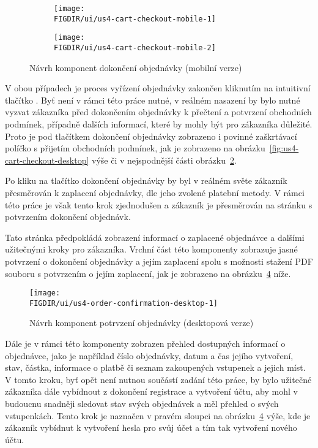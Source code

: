 \begin{figure}[H]
    \centering
    \begin{subfigure}{0.4\textwidth}
        \texttt{[image: \\FIGDIR/ui/us4-cart-checkout-mobile-1]}
        \label{fig:us4-cart-checkout-mobile-1}
    \end{subfigure}
    \hfill
    \begin{subfigure}{0.4\textwidth}
        \texttt{[image: \\FIGDIR/ui/us4-cart-checkout-mobile-2]}
        \label{fig:us4-cart-checkout-mobile-2}
    \end{subfigure}

    \caption{Návrh komponent dokončení objednávky (mobilní verze)}
    \label{fig:us4-cart-checkout-mobile}
\end{figure}

V obou případech je proces vyřízení objednávky zakončen kliknutím na intuitivní tlačítko .
Byť není v rámci této práce nutné, v reálném nasazení by bylo nutné vyzvat zákazníka před dokončením objednávky k přečtení a potvrzení obchodních podmínek, případně dalších informací, které by mohly být pro zákazníka důležité.
Proto je pod tlačítkem dokončení objednávky zobrazeno i povinné zaškrtávací políčko s přijetím obchodních podmínek, jak je zobrazeno na obrázku~\ref{fig:us4-cart-checkout-desktop} výše či v nejspodnější části obrázku~\ref{fig:us4-cart-checkout-mobile-2}.

Po kliku na tlačítko dokončení objednávky by byl v reálném světe zákazník přesměrován k zaplacení objednávky, dle jeho zvolené platební metody.
V rámci této práce je však tento krok zjednodušen a zákazník je přesměrován na stránku s potvrzením dokončení objednávk.

Tato stránka předpokládá zobrazení informací o zaplacené objednávce a dalšími užitečnými kroky pro zákazníka.
Vrchní část této komponenty zobrazuje jasné potvrzení o dokončení objednávky a jejím zaplacení spolu s možnosti stažení PDF souboru s potvrzením o jejím zaplacení, jak je zobrazeno na obrázku~\ref{fig:us4-order-confirmation-desktop} níže.

\begin{figure}[H]
    \centering
    \texttt{[image: \\FIGDIR/ui/us4-order-confirmation-desktop-1]}
    \caption{Návrh komponent potrvzení objednávky (desktopová verze)}
    \label{fig:us4-order-confirmation-desktop}
\end{figure}

Dále je v rámci této komponenty zobrazen přehled dostupných informací o objednávce, jako je například číslo objednávky, datum a čas jejího vytvoření, stav, částka, informace o platbě či seznam zakoupených vstupenek a jejich míst.
V tomto kroku, byť opět není nutnou součástí zadání této práce, by bylo užitečné zákazníka dále vybídnout z dokončení registrace a vytvoření účtu, aby mohl v budoucnu snadněji sledovat stav svých objednávek a měl přehled o svých vstupenkách.
Tento krok je naznačen v pravém sloupci na obrázku~\ref{fig:us4-order-confirmation-desktop} výše, kde je zákazník vybídnut k vytvoření hesla pro svůj účet a tím tak vytvoření nového účtu.


